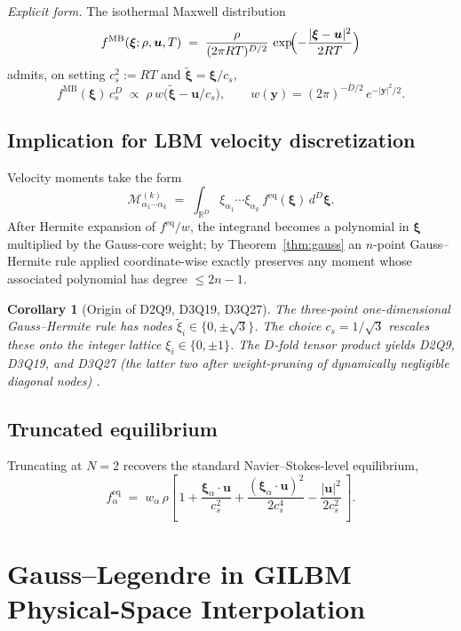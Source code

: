 \documentclass[11pt,a4paper]{article}
\newtheorem{corollary}[theorem]{Corollary}
\theoremstyle{definition}
\newcommand{\R}{\mathbb{R}}
\newcommand{\eq}{\mathrm{eq}}
\newcommand{\MB}{\mathrm{MB}}
\begin{document}
\noindent\emph{Explicit form.} The isothermal Maxwell distribution
\[
  f^{\MB}(\bm{\xi};\rho,\bm{u},T)
  \;=\;\frac{\rho}{(2\pi RT)^{D/2}}\,
       \exp\!\Bigl(-\frac{|\bm{\xi}-\bm{u}|^2}{2RT}\Bigr)
\]
admits, on setting $c_s^2:=RT$ and $\tilde{\bm{\xi}}=\bm{\xi}/c_s$,
\[
  f^{\MB}(\bm{\xi})\,c_s^D
  \;\propto\; \rho\,w\bigl(\tilde{\bm{\xi}}-\bm{u}/c_s\bigr),
  \qquad
  w(\bm{y})=(2\pi)^{-D/2}\,e^{-|\bm{y}|^2/2}.
\]

\subsection{Implication for LBM velocity discretization}

Velocity moments take the form
\[
  \mathcal{M}^{(k)}_{\alpha_1\cdots\alpha_k}
  \;=\;\int_{\R^D}\xi_{\alpha_1}\cdots\xi_{\alpha_k}\,f^{\eq}(\bm{\xi})\,d^D\bm{\xi}.
\]
After Hermite expansion of $f^{\eq}/w$, the integrand becomes a polynomial in
$\bm{\xi}$ multiplied by the Gauss-core weight; by Theorem~\ref{thm:gauss}
an $n$-point Gauss--Hermite rule applied coordinate-wise exactly preserves any
moment whose associated polynomial has degree $\le 2n-1$.

\begin{corollary}[Origin of D2Q9, D3Q19, D3Q27]\label{cor:DnQm}
The three-point one-dimensional Gauss--Hermite rule has nodes
$\tilde\xi_i\in\{0,\pm\sqrt{3}\}$. The choice $c_s=1/\sqrt{3}$ rescales these
onto the integer lattice $\xi_i\in\{0,\pm 1\}$. The $D$-fold tensor product
yields D2Q9, D3Q19, and D3Q27 (the latter two after weight-pruning of
dynamically negligible diagonal nodes)
\cite{HeLuo1997a,Qian1992}.
\end{corollary}

\subsection{Truncated equilibrium}

Truncating at $N=2$ recovers the standard Navier--Stokes-level equilibrium,
\begin{equation}
  f_\alpha^{\eq}
  \;=\; w_\alpha\,\rho
  \left[\,1
        + \frac{\bm{\xi}_\alpha\!\cdot\bm{u}}{c_s^2}
        + \frac{(\bm{\xi}_\alpha\!\cdot\bm{u})^2}{2c_s^4}
        - \frac{|\bm{u}|^2}{2c_s^2}\,\right].
  \label{eq:feq-N2}
\end{equation}

\section{Gauss--Legendre in GILBM Physical-Space Interpolation}\label{sec:GL-GILBM}
\end{document}
